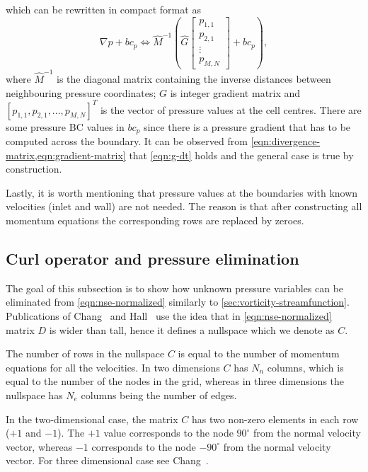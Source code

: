 \documentclass{article}
\numberwithin{equation}{section}
\begin{document}
which can be rewritten in compact format as
$$
\nabla p+b c_p \Longleftrightarrow 
\hat{M}^{-1} \left(\hat{G}\left[\begin{array}{c}
p_{1,1} \\
p_{2,1} \\
\vdots \\
p_{M,N}
\end{array}\right]+bc_p\right),
$$
where $\hat{M}^{-1}$ is the diagonal matrix containing the inverse distances between neighbouring pressure coordinates; ${G}$ is integer gradient matrix and $[p_{1,1},p_{2,1},...,p_{M,N}]^T$ is the vector of pressure values at the cell centres. There are some pressure BC values in ${bc}_p$ since there is a pressure gradient that has to be computed across the boundary. It can be observed from \cref{eqn:divergence-matrix,eqn:gradient-matrix} that \cref{eqn:g-dt} holds and the general case is true by construction. 

Lastly, it is worth mentioning that pressure values at the boundaries with known velocities (inlet and wall) are not needed. The reason is that after constructing all momentum equations the corresponding rows are replaced by zeroes.



\subsection{Curl operator and pressure elimination}\label{subsec:curl}

The goal of this subsection is to show how unknown pressure variables can be eliminated from \cref{eqn:nse-normalized} similarly to \cref{sec:vorticity-streamfunction}. Publications of Chang~\cite{Chang:2002} and Hall~\cite{Hall:1980} use the idea that in \cref{eqn:nse-normalized} matrix $D$ is wider than tall, hence it defines a nullspace which we denote as $C$. 

The number of rows in the nullspace $C$ is equal to the number of momentum equations for all the velocities. In two dimensions $C$ has $N_n$ columns, which is equal to the number of the nodes in the grid, whereas in three dimensions the nullspace has $N_e$ columns being the number of edges.

In the two-dimensional case, the matrix $C$ has two non-zero elements in each row ($+1$ and $-1$). The $+1$ value corresponds to the node $90^\circ$ from the normal velocity vector, whereas $-1$ corresponds to the node $-90^\circ$ from the normal velocity vector.  For three dimensional case see Chang~\cite{Chang:2002}.
\end{document}
